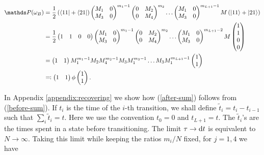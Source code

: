 \begin{align}
\bP(\omega_B) &= \frac{1}{2}\left(\bra{11} + \bra{21} \right)\begin{pmatrix} M_1 & 0 \\ M_3 & 0 \end{pmatrix}^{m_1-1}\begin{pmatrix} 0 & M_2 \\ 0 & M_4 \end{pmatrix}^{m_2}\ldots\begin{pmatrix} M_1 & 0 \\ M_3 & 0 \end{pmatrix}^{m_{L+1}-1}M\left (\ket{11} + \ket{21} \right) \\ 
\label{before-sum}
&= \frac{1}{2}\begin{pmatrix} 1 & 1 & 0 & 0\end{pmatrix}\begin{pmatrix} M_1 & 0 \\ M_3 & 0 \end{pmatrix}^{m_1-1}\begin{pmatrix} 0 & M_2 \\ 0 & M_4 \end{pmatrix}^{m_2}\ldots\begin{pmatrix} M_1 & 0 \\ M_3 & 0 \end{pmatrix}^{m_{L+1}-2}M \begin{pmatrix} 1 \\ 1 \\ 0 \\ 0 \end{pmatrix} \\ 
\label{after-sum}
&= \begin{pmatrix}1 & 1 \end{pmatrix} M_1^{m_1-1}M_2M_4^{m_2-1}M_3M_1^{m_3-1}\ldots M_3M_1^{m_{L+1}-1}\begin{pmatrix} 1 \\ 1\end{pmatrix} \\\label{path-density} &\eqqcolon \begin{pmatrix}1 & 1 \end{pmatrix}\phi\begin{pmatrix} 1 \\ 1\end{pmatrix}.
\end{align}

In Appendix \ref{appendix:recovering} we show how (\ref{after-sum}) follows from (\ref{before-sum}). If $t_i$ is the time of the $i$-th transition, we shall define $\tilde{t}_i = t_i - t_{i-1}$ such that $\sum_i \tilde{t}_i = t$. Here we use the convention $t_0 = 0$ and $t_{L+1} = t$. The $\tilde{t}_i$'s are the times spent in a state before transitioning. The limit $\tau \rightarrow \mathrm{d} t$ is equivalent to $N \rightarrow \infty$. Taking this limit while keeping the ratios $m_i/N$ fixed, for $j = 1,4$ we have 

